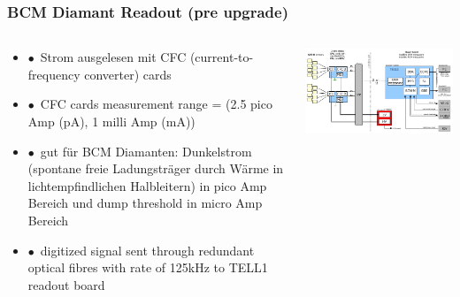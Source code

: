 \documentclass[aspectratio=1610, 12pt, xcolor=dvipsnames]{beamer}
\begin{document}

\begin{frame}\frametitle{BCM Diamant Readout (pre upgrade)}
  \begin{columns}
    \begin{column}[c]{0.48\textwidth}
      \begin{itemize}
        \item $\bullet$\, Strom ausgelesen mit CFC (current-to-frequency converter) cards
        \item $\bullet$\, CFC cards measurement range = (2.5 pico Amp (pA), 1 milli Amp (mA))
        \item $\bullet$\, gut für BCM Diamanten: Dunkelstrom (spontane freie Ladungsträger durch Wärme in lichtempfindlichen Halbleitern) in pico Amp Bereich und dump threshold in micro Amp Bereich
        \item $\bullet$\, digitized signal sent through redundant optical fibres with rate of 125kHz to TELL1 readout board
      \end{itemize}
    \end{column}
    \begin{column}[c]{0.48\textwidth}
      \includegraphics[width=\textwidth]{plots/bcmReadout.png}
    \end{column}
  \end{columns}
\end{frame}
\end{document}

